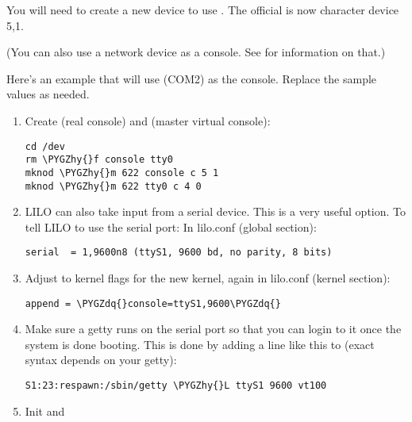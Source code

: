 \documentclass[a4paper,8pt,english]{sphinxmanual}
\def\PYGZhy{\char`\-}
\def\PYGZdq{\char`\"}
\begin{document}
You will need to create a new device to use . The official
 is now character device 5,1.

(You can also use a network device as a console.  See
 for information on that.)

Here's an example that will use  (COM2) as the console.
Replace the sample values as needed.
\begin{enumerate}
\item {} 
Create  (real console) and  (master virtual
console):

\begin{Verbatim}[commandchars=\\\{\}]
cd /dev
rm \PYGZhy{}f console tty0
mknod \PYGZhy{}m 622 console c 5 1
mknod \PYGZhy{}m 622 tty0 c 4 0
\end{Verbatim}

\item {} 
LILO can also take input from a serial device. This is a very
useful option. To tell LILO to use the serial port:
In lilo.conf (global section):

\begin{Verbatim}[commandchars=\\\{\}]
serial  = 1,9600n8 (ttyS1, 9600 bd, no parity, 8 bits)
\end{Verbatim}

\item {} 
Adjust to kernel flags for the new kernel,
again in lilo.conf (kernel section):

\begin{Verbatim}[commandchars=\\\{\}]
append = \PYGZdq{}console=ttyS1,9600\PYGZdq{}
\end{Verbatim}

\item {} 
Make sure a getty runs on the serial port so that you can login to
it once the system is done booting. This is done by adding a line
like this to  (exact syntax depends on your getty):

\begin{Verbatim}[commandchars=\\\{\}]
S1:23:respawn:/sbin/getty \PYGZhy{}L ttyS1 9600 vt100
\end{Verbatim}

\item {} 
Init and 


\end{enumerate}
\end{document}
